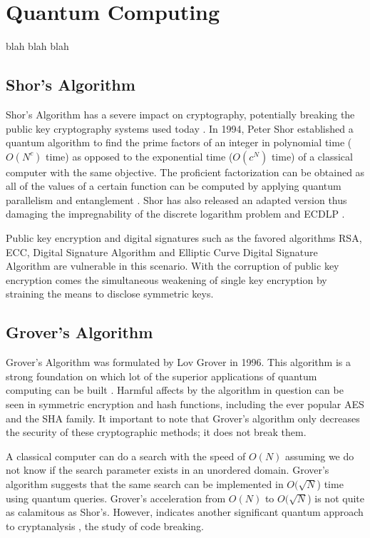 \section{Quantum Computing}
blah blah blah

\subsection{Shor's Algorithm}
Shor's Algorithm has a severe impact on cryptography, potentially breaking the public key cryptography systems used today \cite{Q_Alg}.
In 1994, Peter Shor established a quantum algorithm to find the prime factors of an integer in polynomial time (\(O(N^c)\) time) as opposed to the exponential time (\(O(c^N)\) time) of a classical computer with the same objective. 
The proficient factorization can be obtained as all of the values of a certain function can be computed by applying quantum parallelism and entanglement \cite{Impact_QC_Cryptog_1}. 
Shor has also released an adapted version thus damaging the impregnability of the discrete logarithm problem and ECDLP \cite{Post_Q_Cryptog}. 

Public key encryption and digital signatures such as the favored algorithms RSA, ECC, Digital Signature Algorithm and Elliptic Curve Digital Signature Algorithm are vulnerable in this scenario. With the corruption of public key encryption comes the simultaneous weakening of single key encryption by straining the means to disclose symmetric keys.

\subsection{Grover's Algorithm}
Grover's Algorithm was formulated by Lov Grover in 1996. This algorithm is a strong foundation on which lot of the superior applications of quantum computing can be built \cite{Post_Q_Cryptog}. Harmful affects by the algorithm in question can be seen in symmetric encryption and hash functions, including the ever popular AES and the SHA family. It important to note that Grover's algorithm only decreases the security of these cryptographic methods; it does not break them.

A classical computer can do a search with the speed of \(O(N)\) assuming we do not know if the search parameter exists in an unordered domain. Grover's algorithm suggests that the same search can be implemented in \(O(\sqrt{N}\)) time using quantum queries. Grover's acceleration from \(O(N)\) to \(O(\sqrt{N}\)) is not quite as calamitous as Shor's. However, indicates another significant quantum approach to cryptanalysis \cite{Quantum_Cryptanal}, the study of code breaking. 

